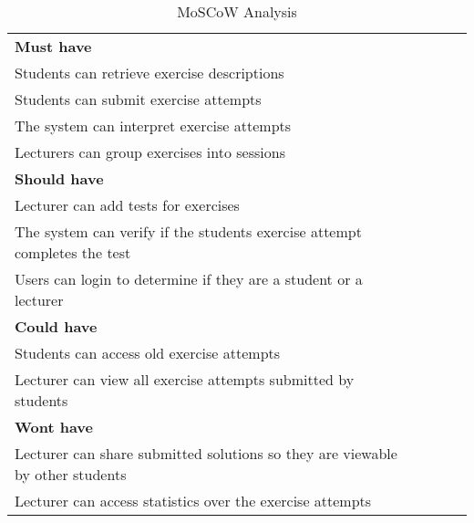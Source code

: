\begin{table}[H]
    \begin{tabular}{|l|llll}
    \cline{1-1}
    \cellcolor[HTML]{C0C0C0}\textbf{Must have}                                    &  &  &  &  \\ \cline{1-1}
    Students can retrieve exercise descriptions                                   &  &  &  &  \\ \cline{1-1}
    Students can submit exercise attempts                                         &  &  &  &  \\ \cline{1-1}
    The system can interpret exercise attempts                                    &  &  &  &  \\ \cline{1-1}
    Lecturers can group exercises into sessions                                   &  &  &  &  \\ \cline{1-1}
    \cellcolor[HTML]{C0C0C0}\textbf{Should have}                                  &  &  &  &  \\ \cline{1-1}
    Lecturer can add tests for exercises                                          &  &  &  &  \\ \cline{1-1}
    The system can verify if the students exercise attempt completes the test     &  &  &  &  \\ \cline{1-1}
    Users can login to determine if they are a student or a lecturer              &  &  &  &  \\ \cline{1-1}
    \cellcolor[HTML]{C0C0C0}\textbf{Could have}                                   &  &  &  &  \\ \cline{1-1}
    Students can access old exercise attempts                                     &  &  &  &  \\ \cline{1-1}
    Lecturer can view all exercise attempts submitted by students                 &  &  &  &  \\ \cline{1-1}
    \cellcolor[HTML]{C0C0C0}\textbf{Wont have}                                    &  &  &  &  \\ \cline{1-1}
    Lecturer can share submitted solutions so they are viewable by other students &  &  &  &  \\ \cline{1-1}
    Lecturer can access statistics over the exercise attempts                     &  &  &  &  \\ \cline{1-1}
    \end{tabular}
    \caption{\label{tab:MOSCOW}MoSCoW Analysis}
\end{table}

